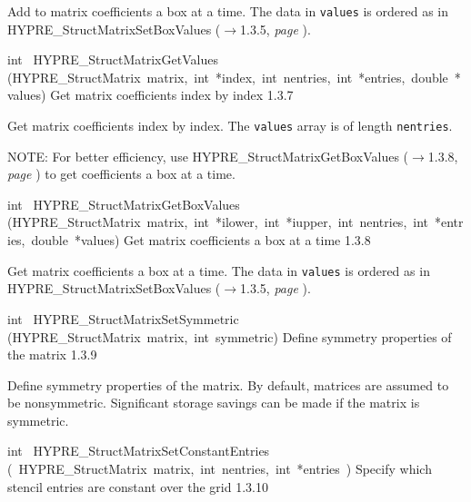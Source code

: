 \documentclass{article}
\begin{document}
\begin{cxxentry}
\begin{cxxentry}
\begin{cxxfunction}
\begin{cxxdoc}
Add to matrix coefficients a box at a time.  The data in {\tt values} is
ordered as in HYPRE\_StructMatrixSetBoxValues ($\rightarrow$1.3.5, {\em page \pageref{cxx.1.3.5}}).
\end{cxxdoc}
\end{cxxfunction}
\begin{cxxfunction}
{int\ }
        {HYPRE\_StructMatrixGetValues}
        {(HYPRE\_StructMatrix\ matrix,\ int\ *index,\ int\ nentries,\ int\ *entries,\ double\ *values)}
        {
Get matrix coefficients index by index}
        {1.3.7}
\begin{cxxdoc}

Get matrix coefficients index by index.  The {\tt values} array is of length
{\tt nentries}.

NOTE: For better efficiency, use HYPRE\_StructMatrixGetBoxValues ($\rightarrow$1.3.8, {\em page \pageref{cxx.1.3.8}}) to get
coefficients a box at a time.
\end{cxxdoc}
\end{cxxfunction}
\begin{cxxfunction}
{int\ }
        {HYPRE\_StructMatrixGetBoxValues}
        {(HYPRE\_StructMatrix\ matrix,\ int\ *ilower,\ int\ *iupper,\ int\ nentries,\ int\ *entries,\ double\ *values)}
        {
Get matrix coefficients a box at a time}
        {1.3.8}
\begin{cxxdoc}

Get matrix coefficients a box at a time.  The data in {\tt values} is
ordered as in HYPRE\_StructMatrixSetBoxValues ($\rightarrow$1.3.5, {\em page \pageref{cxx.1.3.5}}).
\end{cxxdoc}
\end{cxxfunction}
\begin{cxxfunction}
{int\ }
        {HYPRE\_StructMatrixSetSymmetric}
        {(HYPRE\_StructMatrix\ matrix,\ int\ symmetric)}
        {
Define symmetry properties of the matrix}
        {1.3.9}
\begin{cxxdoc}

Define symmetry properties of the matrix.  By default, matrices are assumed
to be nonsymmetric.  Significant storage savings can be made if the matrix is
symmetric.
\end{cxxdoc}
\end{cxxfunction}
\begin{cxxfunction}
{int\ }
        {HYPRE\_StructMatrixSetConstantEntries}
        {(\ HYPRE\_StructMatrix\ matrix,\ int\ nentries,\ int\ *entries\ )}
        {
Specify which stencil entries are constant over the grid}
        {1.3.10}
\begin{cxxdoc}


\end{cxxdoc}
\end{cxxfunction}
\end{cxxentry}
\end{cxxentry}
\end{document}
